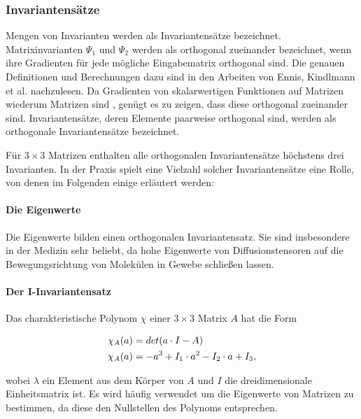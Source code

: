\documentclass[a4paper,fontsize=12pt,toc=bib,halfparskip]{scrartcl}
\begin{document}
\subsubsection{Invariantens\"atze} 
\label{sec:Invariants}
Mengen von Invarianten werden als Invariantens\"atze bezeichnet.
Matrixinvarianten $\Psi_1$ und $\Psi_2$ werden als orthogonal zueinander bezeichnet, wenn ihre Gradienten f\"ur jede m\"ogliche Eingabematrix orthogonal sind. Die genauen Definitionen und Berechnungen dazu sind in den Arbeiten von Ennis, Kindlmann et al. \cite{ennis2006orthogonal} nachzulesen. Da Gradienten von skalarwertigen Funktionen auf Matrizen wiederum Matrizen sind \cite[S.~137]{ennis2006orthogonal}, gen\"ugt es zu zeigen, dass diese orthogonal zueinander sind. Invariantens\"atze, deren Elemente paarweise orthogonal sind, werden als orthogonale Invariantens\"atze bezeichnet.

F\"ur $3\times 3$ Matrizen enthalten alle orthogonalen Invariantens\"atze h\"ochstens drei Invarianten. In der Praxis spielt eine Vielzahl solcher Invariantens\"atze eine Rolle, von denen im Folgenden einige erl\"autert werden:

\paragraph{Die Eigenwerte}

Die Eigenwerte bilden einen orthogonalen Invariantensatz. Sie sind insbesondere in der Medizin sehr beliebt, da hohe Eigenwerte von Diffusionstensoren auf die Bewegungsrichtung von Molek\"ulen in Gewebe schlie{\ss}en lassen.

\paragraph{Der I-Invariantensatz}
Das charakteristische Polynom $\chi$ einer $3\times3$ Matrix $A$ hat die Form

\begin{equation}
	\centering
	\begin{split}
	&\chi_A(a) = det(a \cdot I - A)\\
	&\chi_A(a) = -a^3 + I_1\cdot a^2 - I_2\cdot a + I_3,
	\end{split}
\end{equation}

wobei $\lambda$ ein Element aus dem K\"orper von $A$ und $I$ die dreidimensionale Einheitsmatrix ist. Es wird h\"aufig verwendet um die Eigenwerte von Matrizen zu bestimmen, da diese den Nullstellen des Polynoms entsprechen.
\end{document}
